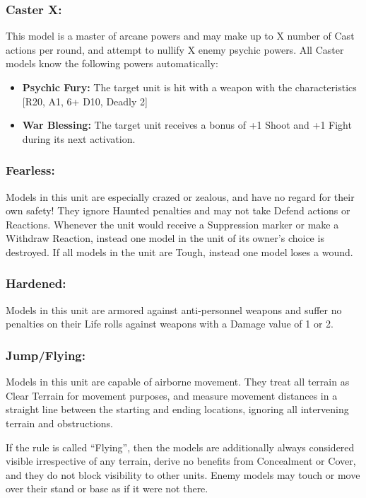 \begin{multicols}{2}
\subsubsection*{Caster X:} This model is a master of arcane powers and may make up to X number of Cast actions per round, and attempt to nullify X enemy psychic powers. All Caster models know the following powers automatically:

\begin{itemize}
    \item \textbf{Psychic Fury:} The target unit is hit with a weapon with the characteristics [R20, A1, 6+ D10, Deadly 2]
    \item \textbf{War Blessing:} The target unit receives a bonus of +1 Shoot and +1 Fight during its next activation.
\end{itemize}

\subsubsection*{Fearless:} Models in this unit are especially crazed or zealous, and have no regard for their own safety! They ignore Haunted penalties and may not take Defend actions or Reactions. Whenever the unit would receive a Suppression marker or make a Withdraw Reaction, instead one model in the unit of its owner's choice is destroyed. If all models in the unit are Tough, instead one model loses a wound.

\subsubsection*{Hardened:} Models in this unit are armored against anti-personnel weapons and suffer no penalties on their Life rolls against weapons with a Damage value of 1 or 2.

\subsubsection*{Jump/Flying:} Models in this unit are capable of airborne movement. They treat all terrain as Clear Terrain for movement purposes, and measure movement distances in a straight line between the starting and ending locations, ignoring all intervening terrain and obstructions.

If the rule is called ``Flying'', then the models are additionally always considered visible irrespective of any terrain, derive no benefits from Concealment or Cover, and they do not block visibility to other units. Enemy models may touch or move over their stand or base as if it were not there.


\end{multicols}
